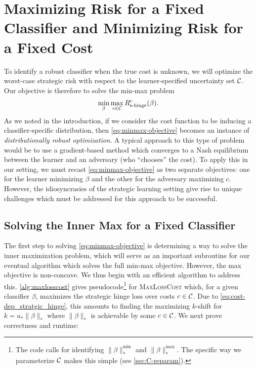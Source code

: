\documentclass{article}
\newcommand{\costset}{\gC}
\newcommand{\costfunc}{c}
\newcommand{\shingepoprisk}{R_{\textrm{s-hinge}}}
\newcommand{\uinv}{\ensuremath{u_{*}}}
\newcommand{\dualnorm}[1]{\|#1\|_{*}}
\newcommand{\cinc}{{\costfunc\in\costset}}
\theoremstyle{definition}
\begin{document}
\section{Maximizing Risk for a Fixed Classifier and Minimizing Risk for a Fixed Cost}

To identify a robust classifier when the true cost is unknown, we will optimize the worst-case strategic risk with respect to the learner-specified uncertainty set $\costset$.
Our objective is therefore to solve the min-max problem
\begin{align}
    \label{eq:minmax-objective}
    \min_{\beta} \max_{\cinc} \shingepoprisk^c(\beta).
\end{align}
As we noted in the introduction, if we consider the cost function to be inducing a classifier-specific distribution, then \cref{eq:minmax-objective} becomes an instance of \emph{distributionally robust optimization}. A typical approach to this type of problem would be to use a gradient-based method which converges to a Nash equilibrium between the learner and an adversary (who ``chooses'' the cost). To apply this in our setting, we must recast \cref{eq:minmax-objective} as two separate objectives: one for the learner minimizing $\beta$ and the other for the adversary maximizing $\costfunc$. However, the idiosyncrasies of the strategic learning setting give rise to unique challenges which must be addressed for this approach to be successful.

\subsection{Solving the Inner Max for a Fixed Classifier}
The first step to solving \cref{eq:minmax-objective} is determining a way to solve the inner maximization problem, which will serve as an important subroutine for our eventual algorithm which solves the full min-max objective. However, the max objective is non-concave. We thus begin with an efficient algorithm to address this.
\cref{alg:maxlosscost} gives pseudocode\footnote{The code calls for identifying $\dualnorm{\beta}^{\min}$ and $\dualnorm{\beta}^{\max}$. The specific way we parameterize $\costset$ makes this simple (see \cref{sec:C-reparam}).} for \textsc{MaxLossCost}
which, for a given classifier $\beta$, maximizes the strategic hinge loss over costs $\costfunc \in \costset$.
Due to \cref{eq:cost-dep_stratgic_hinge}, this amounts to finding the maximizing $k$-shift for $k=\uinv \dualnorm{\beta}$ where $\dualnorm{\beta}$ is achievable by some $\cinc$.
We next prove correctness and runtime: %
\end{document}
